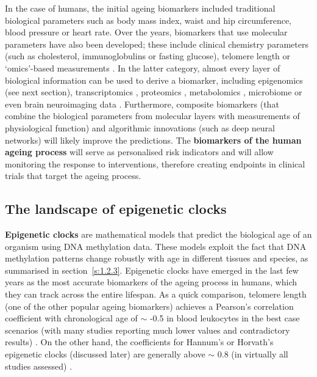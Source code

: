 In the case of humans, the initial ageing biomarkers included traditional biological parameters such as body mass index, waist and hip circumference, blood pressure or heart rate. Over the years, biomarkers that use molecular parameters have also been developed; these include clinical chemistry parameters (such as cholesterol, immunoglobulins or fasting glucose), telomere length or `omics'-based measurements \cite{Burkle2015a,Jylhava2017}. In the latter category, almost every layer of biological information can be used to derive a biomarker, including epigenomics (see next section), transcriptomics \cite{Peters2015a}, proteomics \cite{Tanaka2018}, metabolomics \cite{Hertel2016}, microbiome \cite{Galkin2018} or even brain neuroimaging data \cite{Cole2017a}. Furthermore, composite biomarkers (that combine the biological parameters from molecular layers with measurements of physiological function) \cite{Khan2017} and algorithmic innovations (such as deep neural networks) \cite{Putin2016} will likely improve the predictions. The \textbf{biomarkers of the human ageing process} will serve as personalised risk indicators and will allow monitoring the response to interventions, therefore creating endpoints in clinical trials that target the ageing process.

\smallskip

\subsection{The landscape of epigenetic clocks}

\smallskip

\textbf{Epigenetic clocks} are mathematical models that predict the biological age of an organism using DNA methylation data. These models exploit the fact that DNA methylation patterns change robustly with age in different tissues and species, as summarised in section~\ref{s:1.2.3}. Epigenetic clocks have emerged in the last few years as the most accurate biomarkers of the ageing process in humans, which they can track across the entire lifespan. As a quick comparison, telomere length (one of the other popular ageing biomarkers) achieves a Pearson's correlation coefficient with chronological age of $\sim$ -0.5 in blood leukocytes in the best case scenarios (with many studies reporting much lower values and contradictory results) \cite{Newman2013}. On the other hand, the coefficients for Hannum's or Horvath's epigenetic clocks (discussed later) are generally above $\sim$ 0.8 (in virtually all studies assessed) \cite{Chen2016}.

